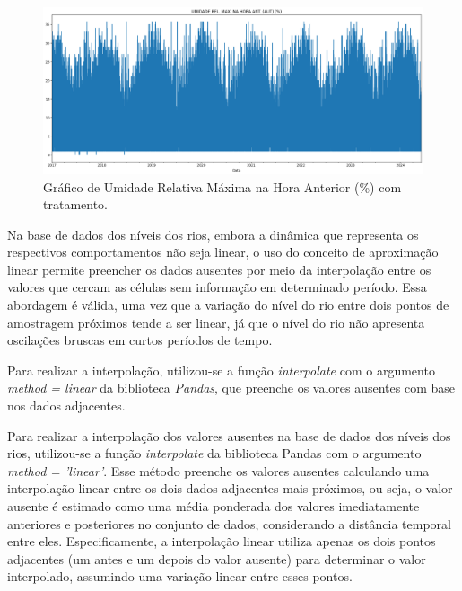 \begin{figure}[H]
	\caption{\label{fig:dados_outlier_com_tratamento}Gráfico de Umidade Relativa Máxima  na Hora Anterior (\%) com tratamento.}
	\begin{center}
		\includegraphics[scale=0.35]{figuras/UMIDADE REL. MAX. NA HORA ANT. (AUT) COM TRATAMENTO.png}
	\end{center}
\end{figure}

Na base de dados dos níveis dos rios, embora a dinâmica que representa os respectivos comportamentos não seja linear, o uso do conceito de aproximação linear permite preencher os dados ausentes por meio da interpolação entre os valores que cercam as células sem informação em determinado período. Essa abordagem é válida, uma vez que a variação do nível do rio entre dois pontos de amostragem próximos tende a ser linear, já que o nível do rio não apresenta oscilações bruscas em curtos períodos de tempo.

Para realizar a interpolação, utilizou-se a função \textit{interpolate} com o argumento \textit{method = linear} da biblioteca \textit{Pandas}, que preenche os valores ausentes com base nos dados adjacentes.

Para realizar a interpolação dos valores ausentes na base de dados dos níveis dos rios, utilizou-se a função \textit{interpolate} da biblioteca Pandas com o argumento \textit{method = 'linear'}. Esse método preenche os valores ausentes calculando uma interpolação linear entre os dois dados adjacentes mais próximos, ou seja, o valor ausente é estimado como uma média ponderada dos valores imediatamente anteriores e posteriores no conjunto de dados, considerando a distância temporal entre eles. Especificamente, a interpolação linear utiliza apenas os dois pontos adjacentes (um antes e um depois do valor ausente) para determinar o valor interpolado, assumindo uma variação linear entre esses pontos.

